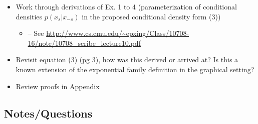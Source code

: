 \documentclass[11pt]{article}
\begin{document}
	\begin{itemize}
		\item Work through derivations of Ex. 1 to 4 (parameterization of conditional densities $p(x_s | x_{-s})$ in the proposed conditional density form (3))
        \begin{itemize}
            \item -- See \url{http://www.cs.cmu.edu/~epxing/Class/10708-16/note/10708_scribe_lecture10.pdf}
        \end{itemize}
        \item Revisit equation (3) (pg 3), how was this derived or arrived at? Is this a known extension of the exponential family definition in the graphical setting? 
		\item Review proofs in Appendix 
	\end{itemize}

\subsection*{Notes/Questions}
	
\end{document}
